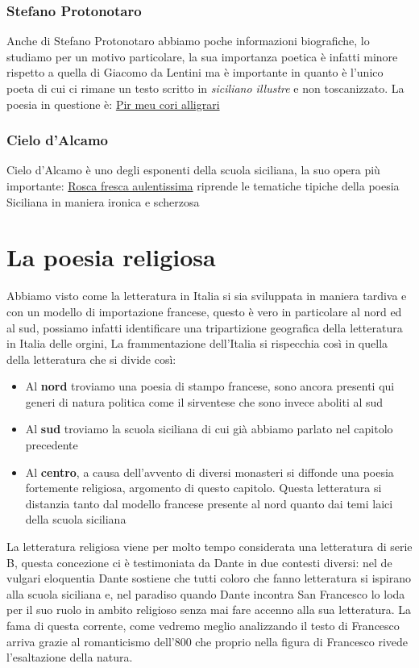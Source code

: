 \documentclass[a4paper, 11pt]{article}
\begin{document}
\subsubsection{Stefano Protonotaro}
Anche di Stefano Protonotaro abbiamo poche informazioni biografiche, lo studiamo per un motivo particolare, la sua importanza poetica è infatti minore rispetto a quella di Giacomo da Lentini ma è importante in quanto è l'unico poeta di cui ci rimane un testo scritto in \textit{siciliano illustre} e non toscanizzato.
La poesia in questione è: \hyperlink{para:pirmeu}{Pir meu cori alligrari
}
\subsubsection{Cielo d'Alcamo}
Cielo d'Alcamo è uno degli esponenti della scuola siciliana, la suo opera più importante: \hyperlink{par:rosafresca}{Rosca fresca aulentissima} riprende le tematiche tipiche della poesia Siciliana in maniera ironica e scherzosa





\section{La poesia religiosa}
Abbiamo visto come la letteratura in Italia si sia sviluppata in maniera tardiva e con un modello di importazione francese, questo è vero in particolare al nord ed al sud, possiamo infatti identificare una tripartizione geografica della letteratura in Italia delle orgini, La frammentazione dell'Italia si rispecchia così in quella della letteratura che si divide così:
\begin{itemize}
    \item Al \textbf{nord} troviamo una poesia di stampo francese, sono ancora presenti qui generi di natura politica come il sirventese che sono invece aboliti al sud
    \item Al \textbf{sud} troviamo la scuola siciliana di cui già abbiamo parlato nel capitolo precedente
    \item Al \textbf{centro}, a causa dell'avvento di diversi monasteri si diffonde una poesia fortemente religiosa, argomento di questo capitolo. Questa letteratura si distanzia tanto dal modello francese presente al nord quanto dai temi laici della scuola siciliana
\end{itemize}

La letteratura religiosa viene per molto tempo considerata una letteratura di serie B, questa concezione ci è testimoniata da Dante in due contesti diversi: nel de vulgari eloquentia Dante sostiene che tutti coloro che fanno letteratura si ispirano alla scuola siciliana e, nel paradiso quando Dante incontra San Francesco lo loda per il suo ruolo in ambito religioso senza mai fare accenno alla sua letteratura.
La fama di questa corrente, come vedremo meglio analizzando il testo di Francesco arriva grazie al romanticismo dell'800 che proprio nella figura di Francesco rivede l'esaltazione della natura.
\end{document}
